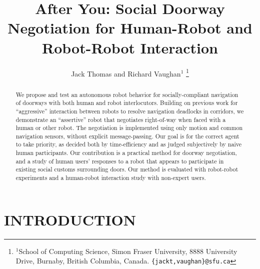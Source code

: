 \documentclass[letterpaper, 10 pt, conference]{ieeeconf}  %
\title{\LARGE \bf
After You: Social Doorway Negotiation for Human-Robot and Robot-Robot Interaction
}
\author{Jack Thomas and Richard Vaughan$^{1}$%
\thanks{$^{1}$School of Computing Science, Simon Fraser University, 8888 University Drive, Burnaby, British Columbia, Canada.
        {\tt\small \{jackt,vaughan\}@sfu.ca}}%
}
\begin{document}
\maketitle
\thispagestyle{empty}
\pagestyle{empty}


\begin{abstract}

We propose and test an autonomous robot behavior for socially-compliant navigation of doorways with both human and robot interlocutors. Building on previous work for ``aggressive'' interaction between robots to resolve navigation deadlocks in corridors, we demonstrate an ``assertive'' robot that negotiates right-of-way when faced with a human or other robot. The negotiation is implemented using only motion and common navigation sensors, without explicit message-passing. Our goal is for the correct agent to take priority, as decided both by time-efficiency and as judged subjectively by naive human participants. Our contribution is a practical method for doorway negotiation, and a study of human users' responses to a robot that appears to participate in existing social customs surrounding doors. Our method is evaluated with robot-robot experiments and a human-robot interaction study with non-expert users.

\end{abstract}


\section{INTRODUCTION}


\end{document}
